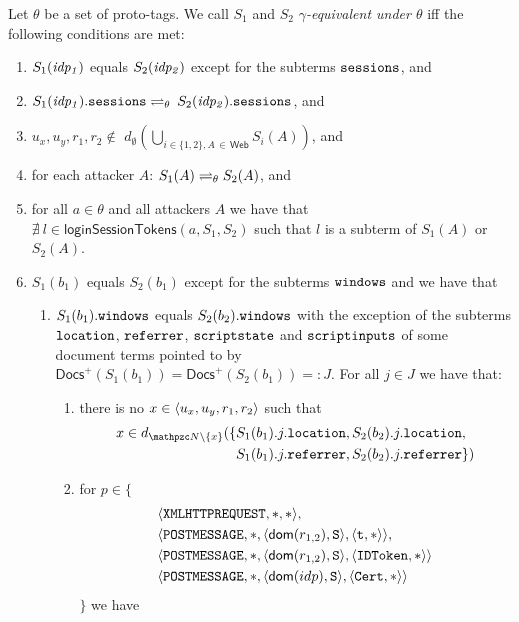   \begin{definition}\label{def:rp:eq-of-states}
    Let $\theta$ be a set of proto-tags. %
    We call $S_1$ and $S_2$ \emph{$\gamma$-equivalent under 
    $\theta$} iff the following conditions are met:
    \begin{enumerate}
    \item\label{eqs:rp:idp} 
      $S_1(\mathit{idp_1})$ equals $S_2(\mathit{idp_2})$ except
      for the subterms $\mathtt{sessions}$, and
    \item\label{eqs:rp:idp-sessions} 
      $S_1(\mathit{idp_1}).\mathtt{sessions} \rightleftharpoons_{\theta}$ 
      $S_2(\mathit{idp_2}).\mathtt{sessions}$, and
    \item\label{eqs:rp:att-unknown}
      $u_x, u_y, r_1, r_2 \not\in $
      $d_\emptyset(\bigcup_{i\in\{1,2\},A\,\in\,\mathsf{Web}}S_i(A))$, and
    \item\label{eqs:rp:att} 
      for each attacker $A$:
      $S_1(A) \rightleftharpoons_{\theta} S_2(A)$, and
    \item\label{eqs:rp:att-not-l} 
      for all $a\in\theta$ and all attackers $A$ we have that
      $\nexists\ l \in \mathsf{loginSessionTokens}(a,S_1,S_2)$ 
      such that $l$ is a subterm of $S_1(A)$ or $S_2(A)$.
    \item\label{eqs:rp:b} 
      $S_1(b_1)$ equals $S_2(b_1)$ except for the subterms 
      $\mathtt{windows}$ and we have that
      \begin{enumerate}
      \item\label{eqs:rp:b:w}
        $S_1(b_1).\mathtt{windows}$ equals $S_2(b_2).\mathtt{windows}$ 
        with the exception of the subterms $\mathtt{location}$, $\mathtt{referrer}$, $\mathtt{scriptstate}$ 
        and $\mathtt{scriptinputs}$ of some document terms pointed 
        to by $\mathsf{Docs}^+(S_1(b_1)) = \mathsf{Docs}^+(S_2(b_1)) =: J$. 
        For all $j \in J$ we have that: 
        \begin{enumerate}
        \item there is no $x\in\langle {{}u_x, u_y, r_1, r_2} \rangle$ such that
          \begin{align*}
            x \in d_{\nonces \setminus \{x\}}(\{&S_1(b_1).j.\str{location}
            ,  S_2(b_2).j.\str{location},\\ & S_1(b_1).j.\str{referrer} , 
            S_2(b_2).j.\str{referrer}\})
          \end{align*}
        \item \label{eqs:rp:b:w:scriptinputs} for $p \in \{$
          \begin{align*}
            & \langle\mathtt{XMLHTTPREQUEST},*,*\rangle,\\
            & \langle\mathtt{POSTMESSAGE},*,\langle\mathsf{dom}(r_{1,2}), \mathtt{S}\rangle,\langle\mathtt{t}, *\rangle\rangle,\\
            & \langle\mathtt{POSTMESSAGE},*,\langle\mathsf{dom}(r_{1,2}), \mathtt{S}\rangle,\langle\mathtt{IDToken}, *\rangle\rangle\\
            & \langle\mathtt{POSTMESSAGE},*,\langle\mathsf{dom}(idp), \mathtt{S}\rangle,\langle\mathtt{Cert}, *\rangle\rangle
          \end{align*}
          $\}$ we have


\end{enumerate}
\end{enumerate}
\end{enumerate}
\end{definition}
